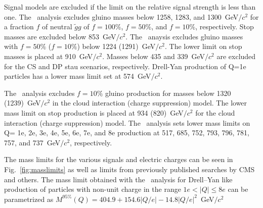 Signal models are excluded if the limit on the relative signal strength is less than one.
The \muononly\ analysis excludes gluino masses below 1258, 1283, and 1300~GeV$/c^2$ for a fraction $f$ of neutral $\tilde{g}g$ of
$f=100\%$, $f=50\%$, and $f=10\%$, respectively. Stop masses are excluded below 853~GeV$/c^2$. The \tktof\ anaysis excludes gluino masses with
$f=50\%$ ($f=10\%$) below 1224 (1291)~GeV$/c^2$. The lower limit on stop masses is placed at 910~GeV$/c^2$. Masses below 435 and 339~GeV$/c^2$ are excluded for the CS 
and DP stau scenarios, respectively. Drell-Yan production of Q=1e particles has a lower mass limit set at 574~GeV$/c^2$. 

The \tkonly\ analysis excludes $f=10\%$ gluino production for masses below 1320 (1239)~GeV$/c^2$ in the cloud interaction (charge suppression) model. 
The lower mass limit on stop production is placed at 934 (820)~GeV$/c^2$ for the cloud interaction (charge suppression) model.
The \multi\ analysis sets lower mass limits on Q= 1e, 2e, 3e, 4e, 5e, 6e, 7e, and 8e production at 517, 685, 752, 793, 796, 781, 757, and 737~GeV$/c^2$, respectively.

The mass limits for the various signals and electric charges can be seen in Fig.~\ref{fig:masslimits} as well as limits from previously published searches by CMS and others.
The mass limit obtained with the \multi\ analysis for Drell--Yan like production of
particles  with non-unit charge in the range $1e<|Q|\leq8e$ can be parametrized
as $M^{95\%}(Q) = 404.9 + 154.6 |Q/e| - 14.8 |Q/e|^2$~GeV$/c^2$

